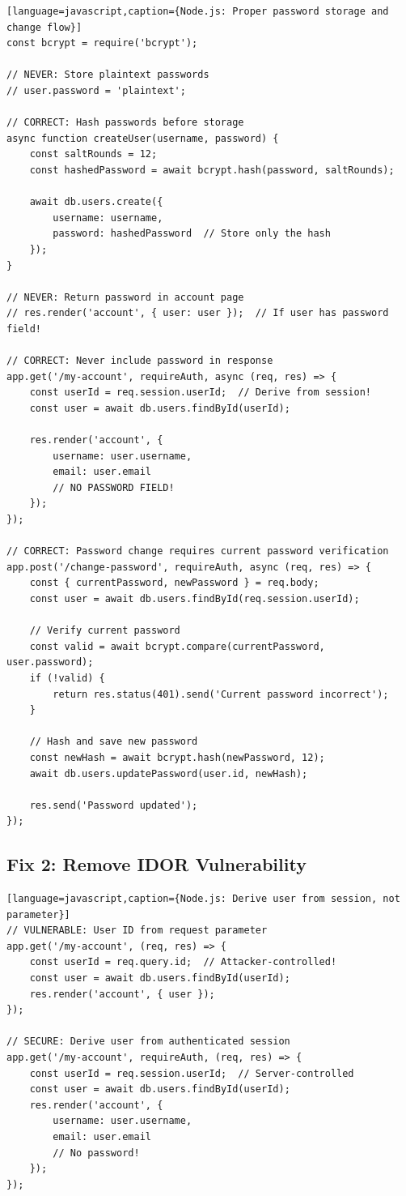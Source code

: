 \documentclass[11pt,letterpaper]{article}
\begin{document}
\begin{verbatim}[language=javascript,caption={Node.js: Proper password storage and change flow}]
const bcrypt = require('bcrypt');

// NEVER: Store plaintext passwords
// user.password = 'plaintext';

// CORRECT: Hash passwords before storage
async function createUser(username, password) {
    const saltRounds = 12;
    const hashedPassword = await bcrypt.hash(password, saltRounds);

    await db.users.create({
        username: username,
        password: hashedPassword  // Store only the hash
    });
}

// NEVER: Return password in account page
// res.render('account', { user: user });  // If user has password field!

// CORRECT: Never include password in response
app.get('/my-account', requireAuth, async (req, res) => {
    const userId = req.session.userId;  // Derive from session!
    const user = await db.users.findById(userId);

    res.render('account', {
        username: user.username,
        email: user.email
        // NO PASSWORD FIELD!
    });
});

// CORRECT: Password change requires current password verification
app.post('/change-password', requireAuth, async (req, res) => {
    const { currentPassword, newPassword } = req.body;
    const user = await db.users.findById(req.session.userId);

    // Verify current password
    const valid = await bcrypt.compare(currentPassword, user.password);
    if (!valid) {
        return res.status(401).send('Current password incorrect');
    }

    // Hash and save new password
    const newHash = await bcrypt.hash(newPassword, 12);
    await db.users.updatePassword(user.id, newHash);

    res.send('Password updated');
});
\end{verbatim}

\subsection{Fix 2: Remove IDOR Vulnerability}

\begin{verbatim}[language=javascript,caption={Node.js: Derive user from session, not parameter}]
// VULNERABLE: User ID from request parameter
app.get('/my-account', (req, res) => {
    const userId = req.query.id;  // Attacker-controlled!
    const user = await db.users.findById(userId);
    res.render('account', { user });
});

// SECURE: Derive user from authenticated session
app.get('/my-account', requireAuth, (req, res) => {
    const userId = req.session.userId;  // Server-controlled
    const user = await db.users.findById(userId);
    res.render('account', {
        username: user.username,
        email: user.email
        // No password!
    });
});
\end{verbatim}
\end{document}
